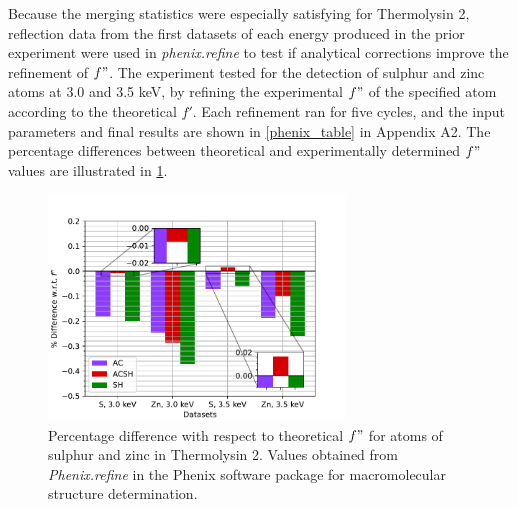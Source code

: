Because the merging statistics were especially satisfying for Thermolysin 2, reflection data from the first datasets of each energy produced 
in the prior experiment were used in \textit{phenix.refine} to test if analytical corrections improve the refinement of $f"$. The experiment tested for the detection of sulphur and zinc atoms at 3.0 and 3.5 \unit{keV}, by refining the experimental $f"$ of the specified atom according to the theoretical $f'$. Each refinement ran for five cycles, and the input parameters and final results are shown in \cref{phenix_table} in Appendix A2. The percentage differences between theoretical and experimentally determined $f"$ values are illustrated in \cref{fig:phenix_plot}.%



\begin{figure}[h]
    \centering
    \includegraphics[width = 0.7\textwidth]{plots/exp1/tlys_2_P6122/FDP_percent_diff.pdf}
    \caption{Percentage difference with respect to theoretical $f"$ for atoms of sulphur and zinc in Thermolysin 2. Values obtained from \textit{Phenix.refine} in the Phenix software package for macromolecular structure determination.}
    \label{fig:phenix_plot}
\end{figure}

